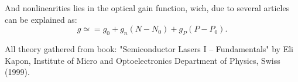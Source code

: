 And nonlinearities lies in the optical gain function, wich, due to several articles can be explained as:
\begin{equation}
	g \simeq = g_0  + g_n(N-N_0) + g_P(P- P_0).
\end{equation}

All theory gathered from book: "Semiconductor Lasers I -- Fundamentals" by Eli Kapon, Institute of Micro and Optoelectronics Department of Physics, Swiss (1999).
